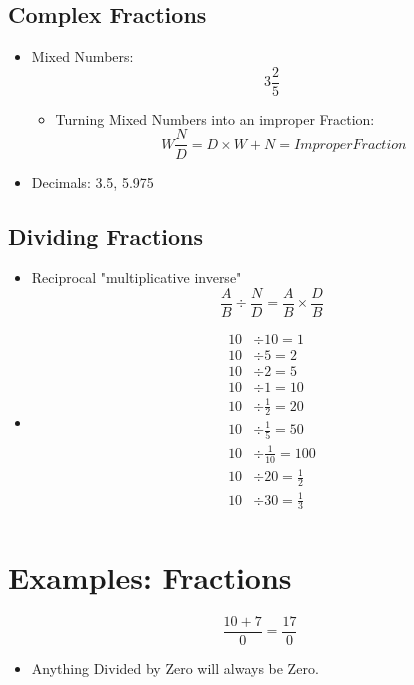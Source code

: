 \documentclass[]{article}
\begin{document}
\subsection{Complex Fractions}
\begin{itemize}
	\item Mixed Numbers:
	\begin{equation}
	3 \frac{2}{5}
	\end{equation}
	\begin{itemize}
		\item Turning Mixed Numbers into an improper Fraction:
		\begin{equation}
			W \frac{N}{D} = D \times W + N = Improper Fraction
		\end{equation}
	\end{itemize}
	\item Decimals:  3.5, 5.975
\end{itemize}


\subsection{Dividing  Fractions}
\begin{itemize}
	\item Reciprocal "multiplicative inverse"
	\begin{equation}
		\frac{A}{B} \div \frac{N}{D}  =  \frac{A}{B} \times \frac{D}{B}		
	\end{equation}
	\item
	\begin{equation}
		\begin{split}
		10 &\div 10 = 1 \\
		10 &\div 5 = 2 \\
		10 &\div 2 = 5 \\
		10 &\div 1 = 10 \\
		10 &\div \frac{1}{2} = 20 \\
		10 &\div \frac{1}{5} = 50 \\
		10 &\div \frac{1}{10} = 100 \\
		10 &\div 20 = \frac{1}{2} \\
		10 &\div 30 = \frac{1}{3} \\
		\end{split}
	\end{equation}
\end{itemize}


\section{Examples: Fractions}
\begin{equation}
	\frac {10+7}{0} = \frac{17}{0}
\end{equation}
\begin{itemize}
	\item Anything Divided by Zero will always be Zero.
\end{itemize}
\end{document}
